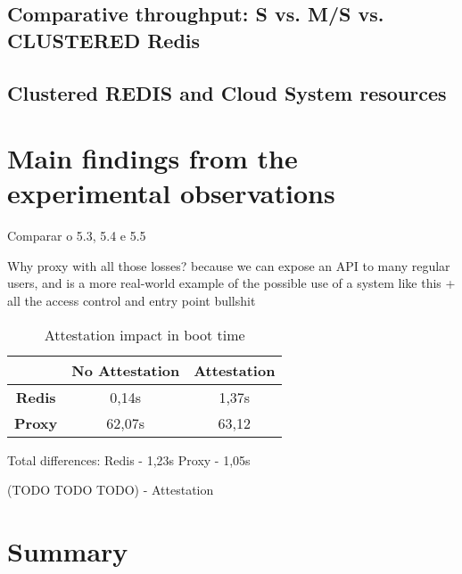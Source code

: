 \subsection{Comparative throughput: S  vs. M/S vs. CLUSTERED Redis}

\subsection{Clustered REDIS and Cloud System resources}

\section{Main findings from the experimental observations}

Comparar o 5.3, 5.4 e 5.5

Why proxy with all those losses? because we can expose an API to many regular users, and is a more real-world example of the possible use of a system like this + all the access control and entry point bullshit

\begin{table}[ht]
	\caption{Attestation impact in boot time} %
	\centering %
	\begin{tabular}{c c c} %
		\hline\hline %
		\textbf{} & \textbf{No Attestation} & \textbf{Attestation} \\ [0.5ex] %
		\hline
		\textbf{Redis} & 0,14s & 1,37s\\
		\hline %
		\textbf{Proxy} & 62,07s & 63,12\\ [1ex] %
		\hline %
	\end{tabular}
	\label{table:attestationImpactBoot} %
\end{table}

Total differences: Redis - 1,23s Proxy - 1,05s

(TODO TODO TODO) - Attestation

\section{Summary}



